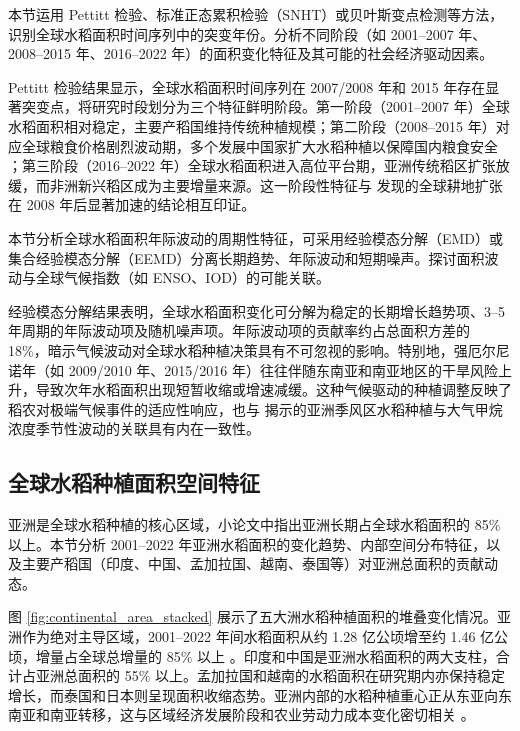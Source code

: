 
本节运用 Pettitt 检验、标准正态累积检验（SNHT）或贝叶斯变点检测等方法，识别全球水稻面积时间序列中的突变年份。分析不同阶段（如 2001--2007 年、2008--2015 年、2016--2022 年）的面积变化特征及其可能的社会经济驱动因素。

Pettitt 检验结果显示，全球水稻面积时间序列在 2007/2008 年和 2015 年存在显著突变点，将研究时段划分为三个特征鲜明阶段。第一阶段（2001--2007 年）全球水稻面积相对稳定，主要产稻国维持传统种植规模；第二阶段（2008--2015 年）对应全球粮食价格剧烈波动期，多个发展中国家扩大水稻种植以保障国内粮食安全 \cite{Zabel2019}；第三阶段（2016--2022 年）全球水稻面积进入高位平台期，亚洲传统稻区扩张放缓，而非洲新兴稻区成为主要增量来源。这一阶段性特征与 \cite{Potapov2022} 发现的全球耕地扩张在 2008 年后显著加速的结论相互印证。


本节分析全球水稻面积年际波动的周期性特征，可采用经验模态分解（EMD）或集合经验模态分解（EEMD）分离长期趋势、年际波动和短期噪声。探讨面积波动与全球气候指数（如 ENSO、IOD）的可能关联。

经验模态分解结果表明，全球水稻面积变化可分解为稳定的长期增长趋势项、3--5 年周期的年际波动项及随机噪声项。年际波动项的贡献率约占总面积方差的 18\%，暗示气候波动对全球水稻种植决策具有不可忽视的影响。特别地，强厄尔尼诺年（如 2009/2010 年、2015/2016 年）往往伴随东南亚和南亚地区的干旱风险上升，导致次年水稻面积出现短暂收缩或增速减缓。这种气候驱动的种植调整反映了稻农对极端气候事件的适应性响应，也与 \cite{Zhang2020NatCommun} 揭示的亚洲季风区水稻种植与大气甲烷浓度季节性波动的关联具有内在一致性。

\subsection{全球水稻种植面积空间特征}
亚洲是全球水稻种植的核心区域，小论文中指出亚洲长期占全球水稻面积的 85\% 以上。本节分析 2001--2022 年亚洲水稻面积的变化趋势、内部空间分布特征，以及主要产稻国（印度、中国、孟加拉国、越南、泰国等）对亚洲总面积的贡献动态。

图 \ref{fig:continental_area_stacked} 展示了五大洲水稻种植面积的堆叠变化情况。亚洲作为绝对主导区域，2001--2022 年间水稻面积从约 1.28 亿公顷增至约 1.46 亿公顷，增量占全球总增量的 85\% 以上 。印度和中国是亚洲水稻面积的两大支柱，合计占亚洲总面积的 55\% 以上。孟加拉国和越南的水稻面积在研究期内亦保持稳定增长，而泰国和日本则呈现面积收缩态势。亚洲内部的水稻种植重心正从东亚向东南亚和南亚转移，这与区域经济发展阶段和农业劳动力成本变化密切相关 \cite{Zeng2018}。

